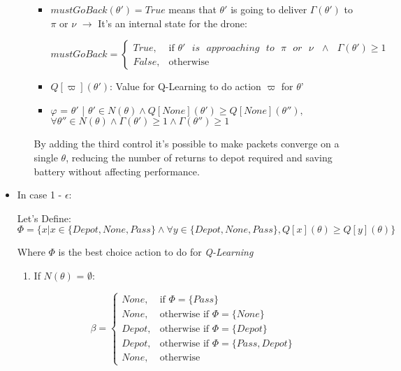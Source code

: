 \documentclass[12pt]{article}
\begin{document}
\begin{itemize}
\begin{enumerate}
\begin{itemize}
            \item $mustGoBack(\theta') = True$ means that $\theta'$ is going to deliver $\Gamma(\theta')$ to $\pi$ or $\nu$ $\rightarrow$ It's an internal state for the drone:
            
            \[
                mustGoBack =
                \begin{cases}
                     True,& \text{if } \theta' \text{ } is \text{ } approaching \text{ } to \text{ } \pi \text{ } or \text{ } \nu \text{ } \wedge \text{ } \Gamma(\theta') \geq 1 \\
                     False,& \text{otherwise}
                \end{cases}
            \]
        
            \item $Q[\varpi](\theta')$: Value for Q-Learning to do action $\varpi$ for $\theta$' 
        
            \item $\varphi$ = $\theta'$ | $\theta' \in N(\theta) \wedge Q[None](\theta') \geq Q[None](\theta''),$ $\forall \theta'' \in N(\theta) \wedge \Gamma(\theta') \geq 1 \wedge \Gamma(\theta'') \geq 1$
            
            
        
        \end{itemize}
    
        By adding the third control it's possible to make packets converge on a single $\theta$, reducing the number of returns to depot required and saving battery without affecting performance.
        
    \end{enumerate}

    \item In case 1 - $\epsilon$:
    
    Let's Define:
    \[
        \Phi = \{ x | x \in \{Depot, None, Pass\} \wedge \forall y \in \{Depot, None, Pass\}, Q[x](\theta) \geq Q[y](\theta)\}
    \]
    
    Where $\Phi$ is the best choice action to do for \textit{Q-Learning}
        
    
    \begin{enumerate}
    
        \item If $N(\theta)$ = $\emptyset$:
        
        \[
            \beta = 
            \begin{cases}
                None,& \text{if } \Phi = \{Pass\} \\
                None,& \text{otherwise if } \Phi = \{None\} \\
                Depot,& \text{otherwise if } \Phi = \{Depot\} \\
                Depot,& \text{otherwise if } \Phi = \{Pass, Depot\}\\
                None,& \text{otherwise}
            \end{cases}
        \]    
        

\end{enumerate}
\end{itemize}
\end{document}
